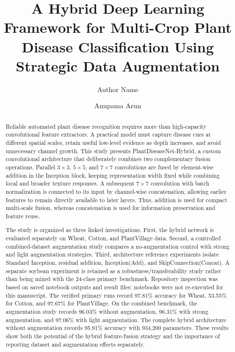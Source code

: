\documentclass[a4paper,fleqn]{cas-dc}
\begin{document}
\let\WriteBookmarks\relax
{}
\title[mode=title]{A Hybrid Deep Learning Framework for Multi-Crop Plant Disease Classification Using Strategic Data Augmentation}
\author[1]{Author Name}
\author[1]{Anupama Arun}

\begin{abstract}
Reliable automated plant disease recognition requires more than high-capacity convolutional feature extractors. A practical model must capture disease cues at different spatial scales, retain useful low-level evidence as depth increases, and avoid unnecessary channel growth. This study presents PlantDiseaseNet-Hybrid, a custom convolutional architecture that deliberately combines two complementary fusion operations. Parallel $3\times3$, $5\times5$, and $7\times7$ convolutions are fused by element-wise addition in the Inception block, keeping representation width fixed while combining local and broader texture responses. A subsequent $7\times7$ convolution with batch normalization is connected to its input by channel-wise concatenation, allowing earlier features to remain directly available to later layers. Thus, addition is used for compact multi-scale fusion, whereas concatenation is used for information preservation and feature reuse.

The study is organized as three linked investigations. First, the hybrid network is evaluated separately on Wheat, Cotton, and PlantVillage data. Second, a controlled combined-dataset augmentation study compares a no-augmentation control with strong and light augmentation strategies. Third, architecture reference experiments isolate Standard Inception, residual addition, Inception(Add), and SkipConnection(Concat). A separate soybean experiment is retained as a robustness/transferability study rather than being mixed with the 24-class primary benchmark. Repository inspection was based on saved notebook outputs and result files; notebooks were not re-executed for this manuscript. The verified primary runs record 97.81\% accuracy for Wheat, 53.55\% for Cotton, and 97.67\% for PlantVillage. On the combined benchmark, the augmentation study records 96.03\% without augmentation, 96.31\% with strong augmentation, and 97.06\% with light augmentation. The complete hybrid architecture without augmentation records 95.91\% accuracy with 934,200 parameters. These results show both the potential of the hybrid feature-fusion strategy and the importance of reporting dataset and augmentation effects separately.
\end{abstract}
\end{document}
